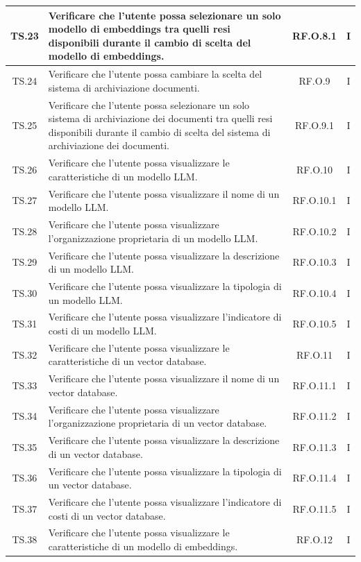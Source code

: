 \begin{xltabular}{\textwidth}{|c|X|c|c|}
\hline
TS.23 & Verificare che l'utente possa selezionare un solo modello di embeddings tra quelli resi disponibili durante il cambio di scelta del modello di embeddings. & RF.O.8.1 & I \\
\hline
TS.24 & Verificare che l'utente possa cambiare la scelta del sistema di archiviazione documenti. & RF.O.9 & I \\
\hline
TS.25 & Verificare che l'utente possa selezionare un solo sistema di archiviazione dei documenti tra quelli resi disponibili durante il cambio di scelta del sistema di archiviazione dei documenti. & RF.O.9.1 & I \\
\hline
TS.26 & Verificare che l'utente possa visualizzare le caratteristiche di un modello LLM. & RF.O.10 & I \\
\hline
TS.27 & Verificare che l'utente possa visualizzare il nome di un modello LLM. & RF.O.10.1 & I \\
\hline
TS.28 & Verificare che l'utente possa visualizzare l’organizzazione proprietaria di un modello LLM. & RF.O.10.2 & I \\
\hline
TS.29 & Verificare che l'utente possa visualizzare la descrizione di un modello LLM. & RF.O.10.3 & I \\
\hline
TS.30 & Verificare che l'utente possa visualizzare la tipologia di un modello LLM. & RF.O.10.4 & I \\
\hline
TS.31 & Verificare che l'utente possa visualizzare l’indicatore di costi di un modello LLM. & RF.O.10.5 & I \\
\hline
TS.32 & Verificare che l'utente possa visualizzare le caratteristiche di un vector database. & RF.O.11 & I \\
\hline
TS.33 & Verificare che l'utente possa visualizzare il nome di un vector database. & RF.O.11.1 & I \\
\hline
TS.34 & Verificare che l'utente possa visualizzare l’organizzazione proprietaria di un vector database. & RF.O.11.2 & I \\
\hline
TS.35 & Verificare che l'utente possa visualizzare la descrizione di un vector database. & RF.O.11.3 & I \\
\hline
TS.36 & Verificare che l'utente possa visualizzare la tipologia di un vector database. & RF.O.11.4 & I \\
\hline
TS.37 & Verificare che l'utente possa visualizzare l’indicatore di costi di un vector database. & RF.O.11.5 & I \\
\hline
TS.38 & Verificare che l'utente possa visualizzare le caratteristiche di un modello di embeddings. & RF.O.12 & I \\

\end{xltabular}
